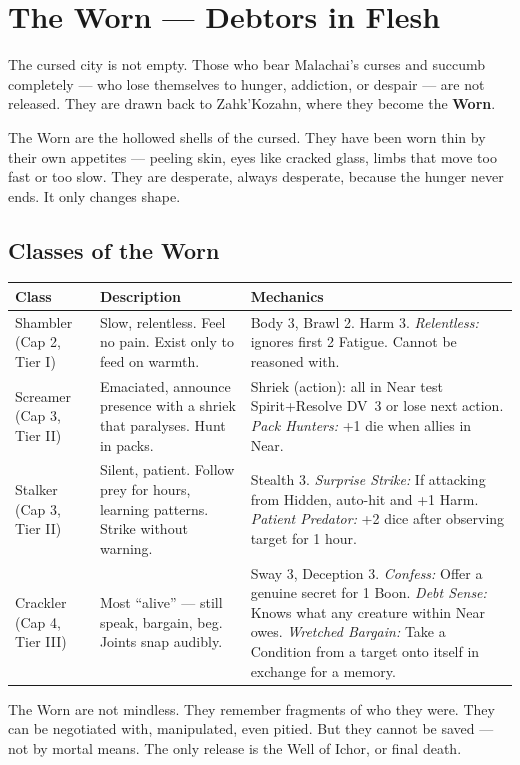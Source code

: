 \documentclass[10pt,twoside]{book}
\newcommand{\dv}[1]{\textsc{DV}~#1}
\begin{document}
\chapter{The Worn --- Debtors in Flesh}

The cursed city is not empty. Those who bear Malachai's curses and succumb completely --- who lose themselves to hunger, addiction, or despair --- are not released. They are drawn back to Zahk'Kozahn, where they become the \textbf{Worn}.

The Worn are the hollowed shells of the cursed. They have been worn thin by their own appetites --- peeling skin, eyes like cracked glass, limbs that move too fast or too slow. They are desperate, always desperate, because the hunger never ends. It only changes shape.

\section{Classes of the Worn}

\begin{tabular}{@{}p{}p{}p{}@{}}
\toprule
\textbf{Class} & \textbf{Description} & \textbf{Mechanics} \\
\midrule
Shambler (Cap 2, Tier I) & Slow, relentless. Feel no pain. Exist only to feed on warmth. & Body 3, Brawl 2. Harm 3. \textit{Relentless:} ignores first 2 Fatigue. Cannot be reasoned with. \\
Screamer (Cap 3, Tier II) & Emaciated, announce presence with a shriek that paralyses. Hunt in packs. & Shriek (action): all in Near test Spirit+Resolve \dv{3} or lose next action. \textit{Pack Hunters:} +1 die when allies in Near. \\
Stalker (Cap 3, Tier II) & Silent, patient. Follow prey for hours, learning patterns. Strike without warning. & Stealth 3. \textit{Surprise Strike:} If attacking from Hidden, auto-hit and +1 Harm. \textit{Patient Predator:} +2 dice after observing target for 1 hour. \\
Crackler (Cap 4, Tier III) & Most ``alive'' --- still speak, bargain, beg. Joints snap audibly. & Sway 3, Deception 3. \textit{Confess:} Offer a genuine secret for 1 Boon. \textit{Debt Sense:} Knows what any creature within Near owes. \textit{Wretched Bargain:} Take a Condition from a target onto itself in exchange for a memory. \\
\bottomrule
\end{tabular}

The Worn are not mindless. They remember fragments of who they were. They can be negotiated with, manipulated, even pitied. But they cannot be saved --- not by mortal means. The only release is the Well of Ichor, or final death.
\end{document}
